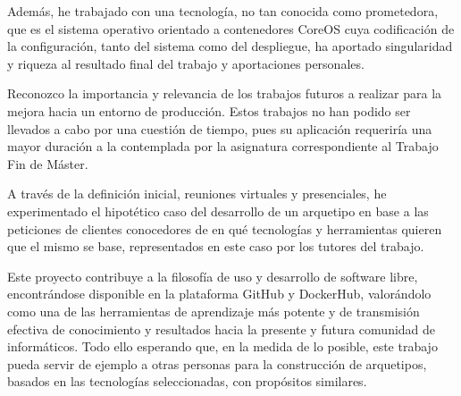 Además, he trabajado con una tecnología, no tan conocida como prometedora, que es el sistema operativo orientado a contenedores CoreOS cuya codificación de la configuración, tanto del sistema como del despliegue, ha aportado singularidad y riqueza al resultado final del trabajo y aportaciones personales.

Reconozco la importancia y relevancia de los trabajos futuros a realizar para la mejora hacia un entorno de producción. Estos trabajos no han podido ser llevados a cabo por una cuestión de tiempo, pues su aplicación requeriría una mayor duración a la contemplada por la asignatura correspondiente al Trabajo Fin de Máster.

A través de la definición inicial, reuniones virtuales y presenciales, he experimentado el hipotético caso del desarrollo de un arquetipo en base a las peticiones de clientes conocedores de en qué tecnologías y herramientas quieren que el mismo se base, representados en este caso por los tutores del trabajo. 

Este proyecto contribuye a la filosofía de uso y desarrollo de software libre, encontrándose disponible en la plataforma GitHub y DockerHub, valorándolo como una de las herramientas de aprendizaje más potente y de transmisión efectiva de conocimiento y resultados hacia la presente y futura comunidad de informáticos. Todo ello esperando que, en la medida de lo posible, este trabajo pueda servir de ejemplo a otras personas para la construcción de arquetipos, basados en las tecnologías seleccionadas, con propósitos similares.

